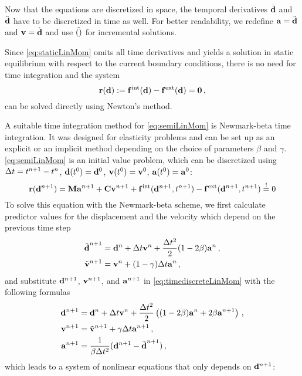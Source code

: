 Now that the equations are discretized in space, the temporal derivatives $\dot{\d}$ and $\Ddot{\d}$ have to be discretized in time as well.
For better readability, we redefine $\a = \Ddot{\d}$ and $\v = \dot{\d}$ and use $\Tilde{()}$ for incremental solutions.

Since \autoref{eq:staticLinMom} omits all time derivatives and yields a solution in static equilibrium with respect to the current boundary conditions, there is no need for time integration and the system
\begin{equation}
    \vec r(\d) := \vec f^\mathrm{int}(\d) - \vec f^\mathrm{ext}(\d)  = \vec 0 \,,
\end{equation}
can be solved directly using Newton's method.

A suitable time integration method for \autoref{eq:semiLinMom} is Newmark-beta time integration.
It was designed for elasticity problems and can be set up as an explicit or an implicit method depending on the choice of parameters $\beta$ and $\gamma$.
\autoref{eq:semiLinMom} is an initial value problem, which can be discretized using $\Delta t = t^{n+1} - t^{n}$, $\d(\tn{0}) = \dn{0}$, $\v(\tn{0}) = \vn{0}$, $\a(\tn{0}) = \an{0}$:
\begin{equation}
   \vec r(\dn{n+1}) = \M \an{n+1} + \C \vn{n+1} + \vec f^\mathrm{int}(\dn{n+1}, \tn{n+1}) - \vec f^\mathrm{ext}(\dn{n+1}, \tn{n+1}) \overset{!}{=} 0 \label{eq:timediscreteLinMom}
\end{equation}
To solve this equation with the Newmark-beta scheme, we first calculate predictor values for the displacement and the velocity which depend on the previous time step
\begin{align}
    \dnp{n+1} &= \dn{n} + \dt \vn{n} + \frac{\dt^2}{2}(1-2\beta)\an{n} \,, \\
    \vnp{n+1} &= \vn{n} + (1-\gamma) \dt \an{n} \,,
\end{align}
and substitute $\dn{n+1}$, $\vn{n+1}$, and $\an{n+1}$ in \autoref{eq:timediscreteLinMom} with the following formulas
\begin{align}
    \dn{n+1} &= \dn{n} + \dt \vn{n} + \frac{\dt^2}{2}\left( (1-2\beta)\an{n} + 2\beta \an{n+1} \right) \,, \label{eq:updated} \\
    \vn{n+1} &= \vnp{n+1} + \gamma \dt \an{n+1} \,, \label{eq:updatev} \\
    \an{n+1} &= \frac{1}{\beta \dt^2} (\dn{n+1} - \dnp{n+1}) \,, \label{eq:updatea}
\end{align}
which leads to a system of nonlinear equations that only depends on $\dn{n+1}$:
